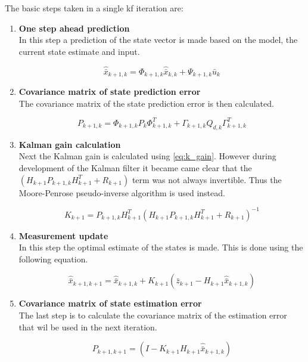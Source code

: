 The basic steps taken in a single \gls{kf} iteration are:
\begin{enumerate}
    \item \textbf{One step ahead prediction}\\
    In this step a prediction of the state vector is made based on the model, the current state estimate and input.  

    \begin{equation}
        {{\hat{\bar x}}_{k + 1,k}} = {\Phi _{k + 1,k}}{{\hat{\bar x}}_{k,k}} + {\Psi _{k + 1,k}}{{\bar u}_k}
    \end{equation}

    \item \textbf{Covariance matrix of state prediction error}\\
    The covariance matrix of the state prediction error is then calculated.

    \begin{equation}
        {P_{k + 1,k}} = {\Phi _{k + 1,k}}{P_k}\Phi _{k + 1,k}^T + {\Gamma _{k + 1,k}}{Q_{d,k}}\Gamma _{k + 1,k}^T
    \end{equation}

    \item \textbf{Kalman gain calculation}\\
    Next the Kalman gain is calculated using \autoref{eq:k_gain}. However during development of the Kalman filter it became came clear that the $({H_{k + 1}}{P_{k + 1,k}}H_{k + 1}^T + {R_{k + 1}})$ term was not always invertible. Thus the Moore-Penrose pseudo-inverse algorithm is used instead. 

    \begin{equation}
        {K_{k + 1}} = {P_{k + 1,k}}H_{k + 1}^T{({H_{k + 1}}{P_{k + 1,k}}H_{k + 1}^T + {R_{k + 1}})^{ - 1}}
        \label{eq:k_gain}
    \end{equation}

    \item \textbf{Measurement update}\\
    In this step the optimal estimate of the states is made. This is done using the following equation.

    \begin{equation}
        {{\hat{\bar x}}_{k + 1,k + 1}} = {{\hat{\bar x}}_{k + 1,k}} + {K_{k + 1}}\left( {{{\bar z}_{k + 1}} - {H_{k + 1}}{{\hat{\bar x}}_{k + 1,k}}} \right)
    \end{equation}

    \item \textbf{Covariance matrix of state estimation error}\\
    The last step is to calculate the covariance matrix of the estimation error that wil be used in the next iteration.

    \begin{equation}
        {P_{k + 1,k + 1}} = \left( {I - {K_{k + 1}}{H_{k + 1}}{{\hat{\bar x}}_{k + 1,k}}} \right)
    \end{equation}
\end{enumerate}


